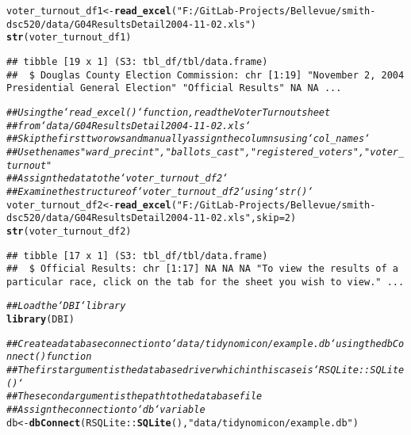 \documentclass{article}\usepackage[]{graphicx}\usepackage[]{xcolor}
\makeatletter
\newcommand{\hlnum}[1]{\textcolor[rgb]{0.686,0.059,0.569}{#1}}%
\newcommand{\hlstr}[1]{\textcolor[rgb]{0.192,0.494,0.8}{#1}}%
\newcommand{\hlcom}[1]{\textcolor[rgb]{0.678,0.584,0.686}{\textit{#1}}}%
\newcommand{\hlopt}[1]{\textcolor[rgb]{0,0,0}{#1}}%
\newcommand{\hlstd}[1]{\textcolor[rgb]{0.345,0.345,0.345}{#1}}%
\newcommand{\hlkwb}[1]{\textcolor[rgb]{0.69,0.353,0.396}{#1}}%
\newcommand{\hlkwc}[1]{\textcolor[rgb]{0.333,0.667,0.333}{#1}}%
\newcommand{\hlkwd}[1]{\textcolor[rgb]{0.737,0.353,0.396}{\textbf{#1}}}%
\newenvironment{kframe}{%
 \def\at@end@of@kframe{}%
 \ifinner\ifhmode%
  \def\at@end@of@kframe{\end{minipage}}%
  \begin{minipage}{\columnwidth}%
 \fi\fi%
 \def\FrameCommand##1{\hskip\@totalleftmargin \hskip-\fboxsep
 \colorbox{shadecolor}{##1}\hskip-\fboxsep
     \hskip-\linewidth \hskip-\@totalleftmargin \hskip\columnwidth}%
 \MakeFramed {\advance\hsize-\width
   \@totalleftmargin\z@ \linewidth\hsize
   \@setminipage}}%
 {\par\unskip\endMakeFramed%
 \at@end@of@kframe}
\newenvironment{knitrout}{}{} %
\makeatother
\begin{document}
\begin{knitrout}
\begin{kframe}
\begin{alltt}
\hlstd{voter_turnout_df1} \hlkwb{<-} \hlkwd{read_excel}\hlstd{(}\hlstr{"F:/GitLab-Projects/Bellevue/smith-dsc520/data/G04ResultsDetail2004-11-02.xls"}\hlstd{)}
\hlkwd{str}\hlstd{(voter_turnout_df1)}
\end{alltt}
\begin{verbatim}
## tibble [19 x 1] (S3: tbl_df/tbl/data.frame)
##  $ Douglas County Election Commission: chr [1:19] "November 2, 2004 Presidential General Election" "Official Results" NA NA ...
\end{verbatim}
\begin{alltt}
\hlcom{## Using the `read_excel()` function, read the Voter Turnout sheet}
\hlcom{## from `data/G04ResultsDetail2004-11-02.xls`}
\hlcom{## Skip the first two rows and manually assign the columns using `col_names`}
\hlcom{## Use the names "ward_precint", "ballots_cast", "registered_voters", "voter_turnout"}
\hlcom{## Assign the data to the `voter_turnout_df2`}
\hlcom{## Examine the structure of `voter_turnout_df2` using `str()`}
\hlstd{voter_turnout_df2} \hlkwb{<-} \hlkwd{read_excel}\hlstd{(}\hlstr{"F:/GitLab-Projects/Bellevue/smith-dsc520/data/G04ResultsDetail2004-11-02.xls"}\hlstd{,}\hlkwc{skip}\hlstd{=}\hlnum{2}\hlstd{)}
\hlkwd{str}\hlstd{(voter_turnout_df2)}
\end{alltt}
\begin{verbatim}
## tibble [17 x 1] (S3: tbl_df/tbl/data.frame)
##  $ Official Results: chr [1:17] NA NA NA "To view the results of a particular race, click on the tab for the sheet you wish to view." ...
\end{verbatim}
\begin{alltt}
\hlcom{## Load the `DBI` library}
\hlkwd{library}\hlstd{(DBI)}

\hlcom{## Create a database connection to `data/tidynomicon/example.db` using the dbConnect() function}
\hlcom{## The first argument is the database driver which in this case is `RSQLite::SQLite()`}
\hlcom{## The second argument is the path to the database file}
\hlcom{## Assign the connection to `db` variable}
\hlstd{db} \hlkwb{<-} \hlkwd{dbConnect}\hlstd{(RSQLite}\hlopt{::}\hlkwd{SQLite}\hlstd{(),}\hlstr{"data/tidynomicon/example.db"}\hlstd{)}


\end{alltt}
\end{kframe}
\end{knitrout}
\end{document}
